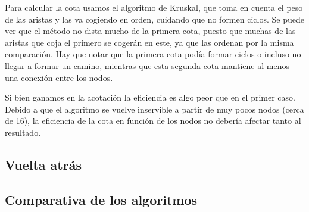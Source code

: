 Para calcular la cota usamos el algoritmo de Kruskal, que toma en cuenta el peso de las aristas y las va cogiendo en orden, cuidando que no formen ciclos. Se puede ver que el método no dista mucho de la primera cota, puesto que muchas de las aristas que coja el primero se cogerán en este, ya que las ordenan por la misma comparación. Hay que notar que la primera cota podía formar ciclos o incluso no llegar a formar un camino, mientras que esta segunda cota mantiene al menos una conexión entre los nodos. 

Si bien ganamos en la acotación %
la eficiencia es algo peor que en el primer caso. Debido a que el algoritmo se vuelve inservible a partir de muy pocos nodos (cerca de 16), la eficiencia de la cota en función de los nodos no debería afectar tanto al resultado. %
\subsection{Vuelta atrás}


\subsection{Comparativa de los algoritmos}

